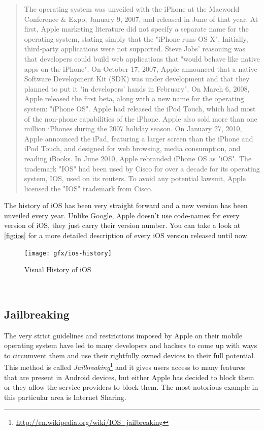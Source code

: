 \begin{quotation}
    The operating system was unveiled with the iPhone at the Macworld Conference \& Expo, January 9, 2007, and released in June of that year. At first, Apple marketing literature did not specify a separate name for the operating system, stating simply that the "iPhone runs OS X". Initially, third-party applications were not supported. Steve Jobs' reasoning was that developers could build web applications that "would behave like native apps on the iPhone". On October 17, 2007, Apple announced that a native Software Development Kit (SDK) was under development and that they planned to put it "in developers' hands in February". On March 6, 2008, Apple released the first beta, along with a new name for the operating system: "iPhone OS".
Apple had released the iPod Touch, which had most of the non-phone capabilities of the iPhone. Apple also sold more than one million iPhones during the 2007 holiday season. On January 27, 2010, Apple announced the iPad, featuring a larger screen than the iPhone and iPod Touch, and designed for web browsing, media consumption, and reading iBooks.
In June 2010, Apple rebranded iPhone OS as "iOS". The trademark "IOS" had been used by Cisco for over a decade for its operating system, IOS, used on its routers. To avoid any potential lawsuit, Apple licensed the "IOS" trademark from Cisco.
\cite{wikipedia:ios}
\end{quotation}

The history of iOS has been very straight forward and a new version has been unveiled every year. Unlike Google, Apple doesn't use code-names for every version of iOS, they just carry their version number. You can take a look at \autoref{fig:ios} for a more detailed description of every iOS version released until now.  

\begin{figure}[H]
    \begin{center}
        {\texttt{[image: gfx/ios-history]}}
        \caption[Visual History of iOS]{Visual History of iOS\footnotemark}\label{fig:ios}
    \end{center}
\end{figure}
\\

\subsection{Jailbreaking}
The very strict guidelines and restrictions imposed by Apple on their mobile operating system have led to many developers and hackers to come up with ways to circumvent them and use their rightfully owned devices to their full potential. This method is called \emph{Jailbreaking}\footnote{\url{http://en.wikipedia.org/wiki/IOS_jailbreaking}}  and it gives users access to many features that are present in Android devices, but either Apple has decided to block them or they allow the service providers to block them. The most notorious example in this particular area is Internet Sharing. 


